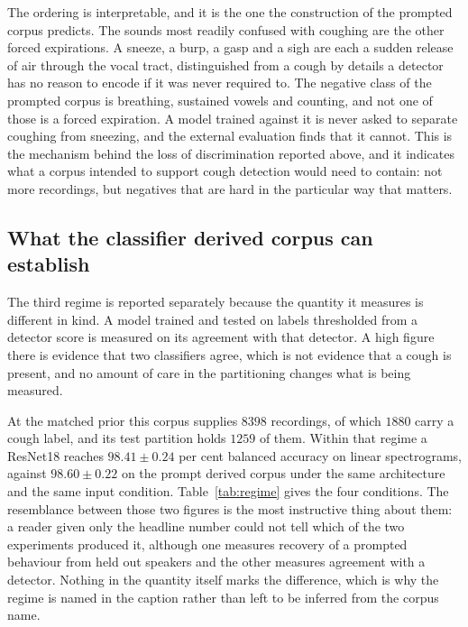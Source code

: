 \documentclass[pdflatex,sn-mathphys-num]{sn-jnl}
\begin{document}
The ordering is interpretable, and it is the one the construction of the prompted corpus
predicts. The sounds most readily confused with coughing are the other forced
expirations. A sneeze, a burp, a gasp and a sigh are each a sudden release of air through
the vocal tract, distinguished from a cough by details a detector has no reason to encode
if it was never required to. The negative class of the prompted corpus is breathing,
sustained vowels and counting, and not one of those is a forced expiration. A model
trained against it is never asked to separate coughing from sneezing, and the external
evaluation finds that it cannot. This is the mechanism behind the loss of discrimination
reported above, and it indicates what a corpus intended to support cough detection would
need to contain: not more recordings, but negatives that are hard in the particular way
that matters.

\subsection{What the classifier derived corpus can establish}\label{sec:res-regime}

The third regime is reported separately because the quantity it measures is different in
kind. A model trained and tested on labels thresholded from a detector score is measured on
its agreement with that detector. A high figure there is evidence that two classifiers
agree, which is not evidence that a cough is present, and no amount of care in the
partitioning changes what is being measured.

At the matched prior this corpus supplies $8398$ recordings, of which $1880$ carry a cough
label, and its test partition holds $1259$ of them. Within that regime a ResNet18 reaches
$98.41 \pm 0.24$ per cent balanced accuracy on linear spectrograms, against $98.60 \pm
0.22$ on the prompt derived corpus under the same architecture and the same input
condition. Table~\ref{tab:regime} gives the four conditions. The resemblance between those
two figures is the most instructive thing about them: a reader given only the headline
number could not tell which of the two experiments produced it, although one measures
recovery of a prompted behaviour from held out speakers and the other measures agreement
with a detector. Nothing in the quantity itself marks the difference, which is why the
regime is named in the caption rather than left to be inferred from the corpus name.
\end{document}
